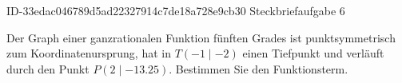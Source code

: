 \begin{exercise}
      {ID-33edac046789d5ad22327914c7de18a728e9cb30}
      {Steckbriefaufgabe 6}
  \ifproblem\problem\par
    Der Graph einer ganzrationalen Funktion fünften Grades ist
    punktsymmetrisch zum Koordinatenursprung, hat in
    $T(\num{-1}\mid\num{-2})$ einen Tiefpunkt und verläuft durch
    den Punkt $P(\num{2}\mid\num{-13.25})$. Bestimmen Sie den
    Funktionsterm.
  \fi
\end{exercise}
